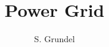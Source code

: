 \documentclass[colorlinks]{article}
\begin{document}
%
\title{Power Grid}
\author{S. Grundel}
\maketitle

%
\end{document}
